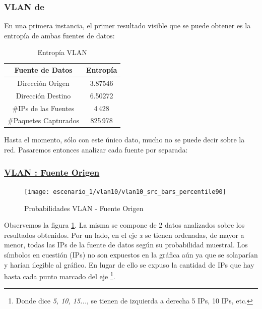 \subsubsection{VLAN de~}
\par En una primera instancia, el primer resultado visible que se puede obtener es la
entrop\'ia de ambas fuentes de datos:

\begin{table}[!h]
\centering
  \begin{tabular}{c c}
    Fuente de Datos & Entrop\'ia \\
    \hline\hline
    Direcci\'on Origen & 3.87546 \\
    Direcci\'on Destino & 6.50272 \\
    \hline\hline
    \#IPs de las Fuentes & 4\,428\\
    \#Paquetes Capturados & 825\,978\\
    \hline
    \end{tabular}
  \bigskip
  \caption{Entrop\'ia VLAN }
\end{table}

\par Hasta el momento, s\'olo con este \'unico dato, mucho no se puede decir sobre la red.
Pasaremos entonces analizar cada fuente por separada:


\subsubsection*{\underline{VLAN : Fuente Origen}}\label{subsubsec:vlan10_src}

\begin{figure}[!ht]
    \centering
    \texttt{[image: escenario\_1/vlan10/vlan10\_src\_bars\_percentile90]}
    \caption{Probabilidades VLAN  - Fuente Origen}
    \label{fig:vlan10_src_prob_per90}
\end{figure}

\par Observemos la figura \ref{fig:vlan10_src_prob_per90}. La misma se compone de 2
datos analizados sobre los resultados obtenidos. Por 
un lado, en el eje \textit{x} se tienen ordenadas, de mayor a menor, todas las IPs de la
fuente de datos seg\'un su probabilidad muestral. Los s\'imbolos en cuesti\'on (IPs) no
son expuestos en la gr\'afica a\'un ya que se solapar\'ian y har\'ian ilegible al gr\'afico.
En lugar de ello se expuso la cantidad de IPs que hay hasta cada punto marcado del eje%
\footnote{Donde dice \textit{5, 10, 15...}, se tienen de izquierda a derecha 5 IPs, 10
IPs, etc.}. 

